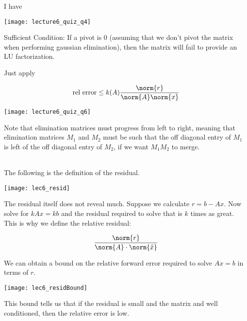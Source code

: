 \documentclass[../main.tex]{subfiles}
\begin{document}
\begin{solution}
    I have

\begin{center}
    \texttt{[image: lecture6\_quiz\_q4]}

    Sufficient Condition: If a pivot is $0$ (assuming that we don't pivot the matrix when performing gaussian elimination), then the matrix will fail to provide an LU factorization.
\end{center}
\end{solution}

Just apply

\[
    \text{rel error} \leq k(A) \frac{\norm{r}}{\norm{A}\norm{x}} 
\]

\begin{center}
    \texttt{[image: lecture6\_quiz\_q6]}

    Note that elimination matrices must progress from left to right, meaning that elimination matrices $M_1$ and $M_2$ must be such that the off diagonal entry of $M_1$ is left of the off diagonal entry of $M_2$, if we want $M_1 M_2$ to merge.
\end{center}


\breathe \\

The following is the definition of the residual.
\begin{center}
    \texttt{[image: lec6\_resid]}
\end{center}

\begin{remark}
    The residual itself does not reveal much. Suppose we calculate $r = b - Ax$. Now solve for $kAx = kb$ and the residual required to solve that is $k$ times as great. This is why we define the relative residual:

    \[
        \frac{\norm{r}}{\norm{A} \cdot \norm{\hat{x}}}
    \]
\end{remark}

We can obtain a bound on the relative forward error required to solve $Ax = b$ in terms of $r$.
\begin{center}
    \texttt{[image: lec6\_residBound]}
\end{center}

\begin{remark}
    This bound tells us that if the residual is small and the matrix and well conditioned, then the relative error is low.
\end{remark}
\end{document}
